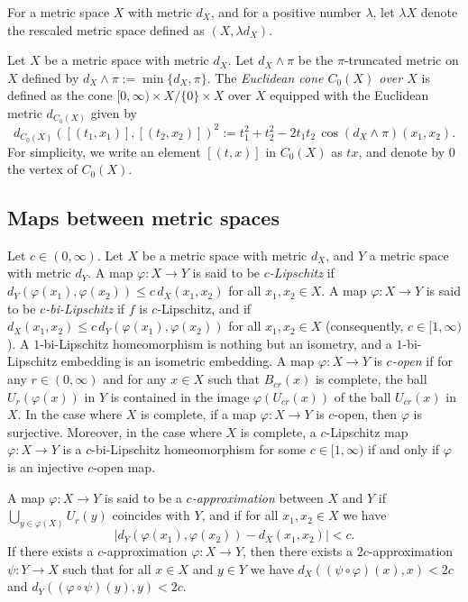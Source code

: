 \documentclass[a4paper,12pt]{amsart}
\numberwithin{equation}{section}
\theoremstyle{plain}
\theoremstyle{definition}
\theoremstyle{remark}
\begin{document}
For a metric space $X$ with metric $d_X$,
and for a positive number $\lambda$,
let $\lambda X$ denote the rescaled metric space
defined as $(X, \lambda d_X)$.

Let $X$ be a metric space with metric $d_X$.
Let $d_X \wedge \pi$ be the $\pi$-truncated metric on $X$
defined by $d_X \wedge \pi := \min \{ d_X, \pi \}$.
The 
\emph{Euclidean cone $C_0(X)$ over $X$}
is defined as the cone 
$[0,\infty) \times X / \{ 0 \} \times X$
over $X$
equipped with the Euclidean metric
$d_{C_0(X)}$ given by
\[
d_{C_0(X)} \left( [(t_1,x_1)], [(t_2,x_2)] \right)^2 := 
t_1^2 + t_2^2 - 2t_1t_2 \, \cos \left( d_X \wedge \pi \right) (x_1,x_2).
\]
For simplicity,
we write an element $[(t,x)]$ in $C_0(X)$ as $tx$,
and denote by $0$ the vertex of $C_0(X)$.

\subsection{Maps between metric spaces}

Let $c \in (0,\infty)$.
Let $X$ be a metric space with metric $d_X$,
and $Y$ a metric space with metric $d_Y$.
A map $\varphi \colon X \to Y$ is said to be
\emph{$c$-Lipschitz} 
if 
$d_Y \left( \varphi(x_1), \varphi(x_2) \right) \le c \, d_X(x_1,x_2)$
for all $x_1, x_2 \in X$.
A map $\varphi \colon X \to Y$ is said to be
\emph{$c$-bi-Lipschitz} 
if $f$ is $c$-Lipschitz,
and if $d_X(x_1,x_2) \le c \, d_Y \left( \varphi(x_1), \varphi(x_2) \right)$
for all $x_1, x_2 \in X$
(consequently, $c \in [1,\infty)$).
A $1$-bi-Lipschitz homeomorphism
is nothing but an isometry,
and a $1$-bi-Lipschitz embedding is 
an isometric embedding.
A map $\varphi \colon X \to Y$ is 
\emph{$c$-open}
if for any $r \in (0,\infty)$ and for any $x \in X$
such that $B_{cr}(x)$ is complete,
the ball $U_r \left( \varphi(x) \right)$ in $Y$ 
is contained in the image $\varphi \left( U_{cr}(x) \right)$
of the ball $U_{cr}(x)$ in $X$.
In the case where $X$ is complete,
if a map $\varphi \colon X \to Y$ is $c$-open,
then $\varphi$ is surjective.
Moreover,
in the case where $X$ is complete,
a $c$-Lipschitz map $\varphi \colon X \to Y$
is a $c$-bi-Lipschitz homeomorphism for some $c \in [1,\infty)$
if and only if $\varphi$ is an injective $c$-open map.

A map $\varphi \colon X \to Y$ is said to be a
\emph{$c$-approximation} between $X$ and $Y$
if $\bigcup_{y \in \varphi(X)} U_r(y)$ coincides with $Y$,
and if for all $x_1, x_2 \in X$ we have
\[
\left\vert
d_Y \left( \varphi(x_1), \varphi(x_2) \right) - d_X(x_1,x_2)
\right\vert
< c.
\]
If there exists a $c$-approximation $\varphi \colon X \to Y$,
then there exists a $2c$-approximation $\psi \colon Y \to X$ such that
for all $x \in X$ and $y \in Y$ we have
$d_X \left( (\psi \circ \varphi)(x), x \right) < 2c$ and
$d_Y \left( (\varphi \circ \psi)(y), y \right) < 2c$.
\end{document}
